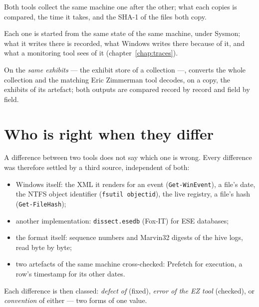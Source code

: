 \documentclass[11pt,a4paper,oneside]{report}
\begin{document}
\begin{description}[style=nextline,leftmargin=1em]
  \item[Collection: \wac{} against KAPE] Both tools collect the same machine
        one after the other; what each copies is compared, the time it takes,
        and the SHA-1 of the files both copy.
  \item[Traces left: \wac{}, KAPE and the EZ tools] Each one is started from the
        same state of the same machine, under Sysmon; what it writes there is
        recorded, what Windows writes there because of it, and what a
        monitoring tool sees of it (chapter~\ref{chap:traces}).
  \item[Decoding: \wac{} against the EZ tools] On the \emph{same exhibits} ---
        the exhibit store of a \wac{} collection ---, \wac{} converts the whole
        collection and the matching Eric Zimmerman tool decodes, on a copy, the
        exhibits of its artefact; both outputs are compared record by record and
        field by field.
\end{description}

\section{Who is right when they differ}

A difference between two tools does not say which one is wrong. Every difference
was therefore settled by a third source, independent of both:

\begin{itemize}[nosep]
  \item Windows itself: the XML it renders for an event (\texttt{Get-WinEvent}),
        a file's date, the NTFS object identifier (\texttt{fsutil objectid}), the
        live registry, a file's hash (\texttt{Get-FileHash});
  \item another implementation: \texttt{dissect.esedb} (Fox-IT) for ESE
        databases;
  \item the format itself: sequence numbers and Marvin32 digests of the hive
        logs, read byte by byte;
  \item two artefacts of the same machine cross-checked: Prefetch for execution,
        a row's timestamp for its other dates.
\end{itemize}

Each difference is then classed: \emph{defect of \wac{}} (fixed), \emph{error of
the EZ tool} (checked), or \emph{convention} of either --- two forms of one value.
\end{document}
